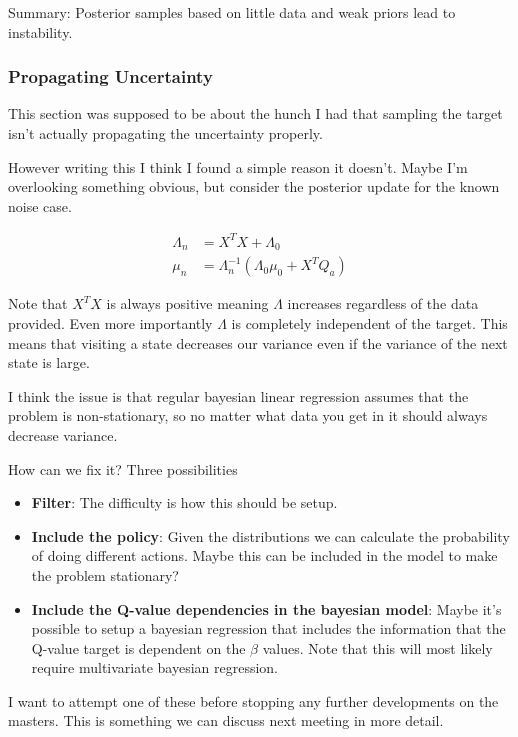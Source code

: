 Summary: Posterior samples based on little data and weak priors lead to instability.

\subsubsection{Propagating Uncertainty}

This section was supposed to be about the hunch I had that sampling the target isn't actually propagating the uncertainty properly. 

However writing this I think I found a simple reason it doesn't. Maybe I'm overlooking something obvious, but consider the posterior update for the known noise case.

\begin{align}
\Lambda_n & = X^TX + \Lambda_0 \\
\mu_n     & = \Lambda_n^{-1}(\Lambda_0\mu_0 + X^TQ_a)
\end{align}

Note that $X^TX$ is always positive meaning $\Lambda$ increases regardless of the data provided. Even more importantly $\Lambda$ is completely independent of the target. This means that visiting a state decreases our variance even if the variance of the next state is large.

I think the issue is that regular bayesian linear regression assumes that the problem is non-stationary, so no matter what data you get in it should always decrease variance.

How can we fix it? Three possibilities

\begin{itemize}
    \item \textbf{Filter}: The difficulty is how this should be setup.
    \item \textbf{Include the policy}: Given the distributions we can calculate the probability of doing different actions. Maybe this can be included in the model to make the problem stationary? 
    \item \textbf{Include the Q-value dependencies in the bayesian model}: Maybe it's possible to setup a bayesian regression that includes the information that the Q-value target is dependent on the $\beta$ values. Note that this will most likely require multivariate bayesian regression.
\end{itemize}

I want to attempt one of these before stopping any further developments on the masters. This is something we can discuss next meeting in more detail.

